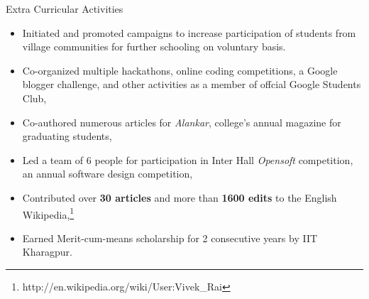 \documentclass{article}
\newlength{\tabin}
\newlength{\secsep}
\newcommand{\lineunder}{\vspace*{-8pt} \\ \hspace*{-6pt} \hrulefill \\ \vspace*{-15pt}}
\newenvironment{tabbedsection}[1]{
  \begin{list}{}{
      \setlength{\itemsep}{0pt}
      \setlength{\labelsep}{0pt}
      \setlength{\labelwidth}{0pt}
      \setlength{\leftmargin}{\tabin}
      \setlength{\rightmargin}{\tabin}
      \setlength{\listparindent}{0pt}
      \setlength{\parsep}{0pt}
      \setlength{\parskip}{0pt}
      \setlength{\partopsep}{0pt}
      \setlength{\topsep}{#1}
    }
  \item[]
}{\end{list}}
\newenvironment{resume_section}[1]{
  \filbreak
  \vspace{2\secsep}
  \textsc{\large#1}
  \lineunder
  \begin{tabbedsection}{\secsep}
}{\end{tabbedsection}}
\newenvironment{subitems}{
  \renewcommand{\labelitemi}{$\cdot$}
  \begin{itemize}
      \setlength{\labelsep}{1em}
}{\end{itemize}}
\begin{document}
\begin{resume_section}{Extra Curricular Activities}
    \begin{subitems}
    \item Initiated and promoted campaigns to increase participation of students from village communities for further schooling on voluntary basis.
      \item Co-organized multiple hackathons, online coding competitions, a Google blogger challenge, and other activities as a member of offcial Google Students Club,
      \item Co-authored numerous articles for \emph{Alankar}, college's annual magazine for graduating students,
      \item Led a team of 6 people for participation in Inter Hall \emph{Opensoft} competition, an annual software design competition,
      \item Contributed over \textbf{30 articles} and more than \textbf{1600 edits} to the English Wikipedia,\footnote{http://en.wikipedia.org/wiki/User:Vivek\_Rai}
      \item Earned Merit-cum-means scholarship for 2 consecutive years by IIT Kharagpur.
    \end{subitems}
\end{resume_section}
\end{document}
